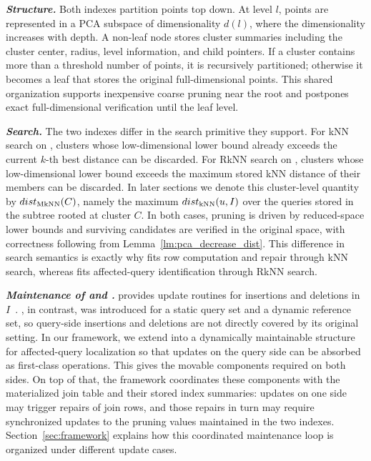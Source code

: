 \noindent\textbf{\textit{Structure.}}
Both indexes partition points top down. At level $l$, points are represented in a PCA subspace of dimensionality $d(l)$, where the dimensionality increases with depth. A non-leaf node stores cluster summaries including the cluster center, radius, level information, and child pointers. If a cluster contains more than a threshold number of points, it is recursively partitioned; otherwise it becomes a leaf that stores the original full-dimensional points. This shared organization supports inexpensive coarse pruning near the root and postpones exact full-dimensional verification until the leaf level.

\noindent\textbf{\textit{Search.}}
The two indexes differ in the search primitive they support. For kNN search on \deltatree, clusters whose low-dimensional lower bound already exceeds the current $k$-th best distance can be discarded. For RkNN search on \hdrtree, clusters whose low-dimensional lower bound exceeds the maximum stored kNN distance of their members can be discarded. In later sections we denote this cluster-level quantity by $dist_{\operatorname{MkNN}}(C)$, namely the maximum $dist_{\operatorname{kNN}}(u,I)$ over the queries stored in the subtree rooted at cluster $C$. In both cases, pruning is driven by reduced-space lower bounds and surviving candidates are verified in the original space, with correctness following from Lemma~\ref{lm:pca_decrease_dist}. This difference in search semantics is exactly why \deltatree fits row computation and repair through kNN search, whereas \hdrtree fits affected-query identification through RkNN search.

\noindent\textbf{\textit{Maintenance of \deltatree and \hdrtree.}}
\deltatree provides update routines for insertions and deletions in $I$~\cite{cui2003contorting}. \hdrtree, in contrast, was introduced for a static query set and a dynamic reference set, so query-side insertions and deletions are not directly covered by its original setting. In our framework, we extend \hdrtree into a dynamically maintainable structure for affected-query localization so that updates on the query side can be absorbed as first-class operations. This gives \dualtree the movable components required on both sides. On top of that, the framework coordinates these components with the materialized join table and their stored index summaries: updates on one side may trigger repairs of join rows, and those repairs in turn may require synchronized updates to the pruning values maintained in the two indexes. Section~\ref{sec:framework} explains how this coordinated maintenance loop is organized under different update cases.

